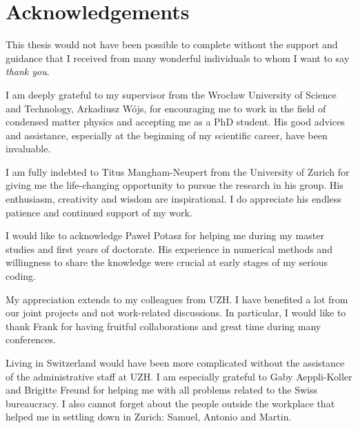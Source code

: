 
\bigskip

\begingroup
\let\clearpage\relax
\let\cleardoublepage\relax
\let\cleardoublepage\relax
\chapter*{Acknowledgements}

\def\thanks#1{%
\begingroup
\leftskip1em
\noindent #1
\par
\endgroup
}

This thesis would not have been possible to complete without the support and guidance that I received from many wonderful individuals to whom I want to say \emph{thank you}.

\vspace{0.12cm}
\noindent I am deeply grateful to my supervisor from the Wrocław University of Science and Technology, Arkadiusz Wójs, for encouraging me to work in the field of condensed matter physics and accepting me as a PhD student. His good advices and assistance, especially at the beginning of my scientific career, have been invaluable.

\vspace{0.12cm}
\noindent I am fully indebted to Titus Mangham-Neupert from the University of Zurich for giving me the life-changing opportunity to pursue the research in his group. His enthusiasm, creativity and wisdom are inspirational. I do appreciate his endless patience and continued support of my work.

\vspace{0.12cm}
\noindent I would like to acknowledge Paweł Potasz for helping me during my master studies and first years of doctorate. His experience in numerical methods and willingness to share the knowledge were crucial at early stages of my serious coding.

\vspace{0.12cm}
\noindent My appreciation extends to my colleagues from UZH. I have benefited a lot from our joint projects and not work-related discussions. In particular, I would like to thank Frank for having fruitful collaborations and great time during many conferences.

\vspace{0.12cm}
\noindent Living in Switzerland would have been more complicated without the assistance of the administrative staff at UZH. I am especially grateful to Gaby Aeppli-Koller and Brigitte Freund for helping me with all problems related to the Swiss bureaucracy. I also cannot forget about the people outside the workplace that helped me in settling down in Zurich: Samuel, Antonio and Martin.

